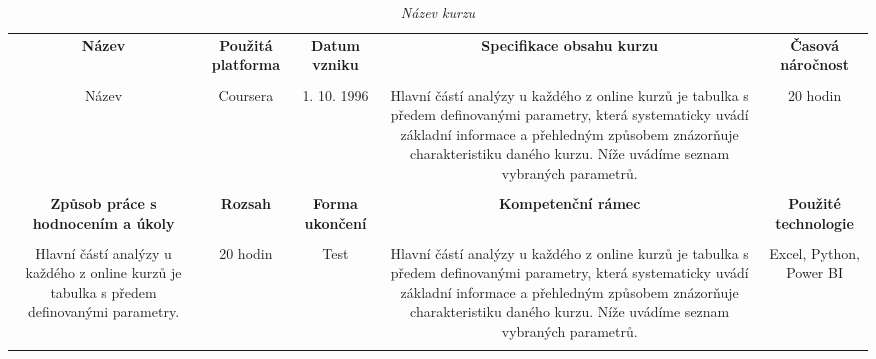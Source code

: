 \begin{landscape}
\begin{table}[htbp]
  \renewcommand\thetable{2}
  \caption{\textit{Název kurzu}}\label{tab2}
  \scriptsize
  {
    \justifying
    \begin{tabularx}{\linewidth}{CCCCC}
      \toprule
     
      \textbf{Název} &
      \textbf{Použitá platforma} &
      \textbf{Datum vzniku} &
      \textbf{Specifikace obsahu kurzu} &
      \textbf{Časová náročnost}  \\
      
      \tabularnewline
      \midrule
      
        Název 
        &
        Coursera 
        &
        1. 10. 1996 
        &
        Hlavní částí analýzy u každého z online kurzů je tabulka s předem definovanými parametry, která systematicky uvádí základní informace a přehledným způsobem znázorňuje charakteristiku daného kurzu. Níže uvádíme seznam vybraných parametrů. 
        &
        20 hodin 
        \\
        
              \tabularnewline

      \toprule

        \textbf{Způsob práce s hodnocením a úkoly} &
        \textbf{Rozsah} &
        \textbf{Forma ukončení} &
        \textbf{Kompetenční rámec} &
        \textbf{Použité technologie} \\
      
        \tabularnewline
      \midrule
      
        Hlavní částí analýzy u každého z online kurzů je tabulka s předem definovanými parametry. 
        &
        20 hodin 
        &
        Test 
        &
Hlavní částí analýzy u každého z online kurzů je tabulka s předem definovanými parametry, která systematicky uvádí základní informace a přehledným způsobem znázorňuje charakteristiku daného kurzu. Níže uvádíme seznam vybraných parametrů.
        &
        Excel, Python, Power BI 
        \\

        \tabularnewline
      \bottomrule
    \end{tabularx}
  }
\end{table}
\end{landscape}